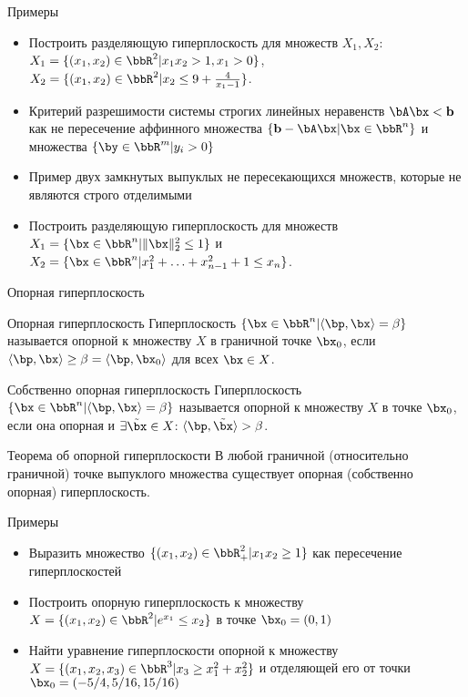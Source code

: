 \documentclass[12pt]{beamer}
\begin{document}
\begin{frame}{Примеры}
\begin{itemize}
\item Построить разделяющую гиперплоскость для множеств $X_1, X_2$: $X_1 = \{ (x_1, x_2) \in \bbR^2 | x_1x_2 > 1, x_1 > 0 \}$, $X_2 = \{ (x_1, x_2) \in \bbR^2 |  x_2 \leq 9 + \frac{4}{x_1 - 1} \}$.
\item Критерий разрешимости системы строгих линейных неравенств $\bA\bx < \mathbf{b}$ как не пересечение аффинного множества $\{\mathbf{b} - \bA\bx | \bx \in \bbR^n \}$ и множества $\{ \by \in \bbR^m | y_i > 0 \}$ 
\item Пример двух замкнутых выпуклых не пересекающихся множеств, которые не являются строго отделимыми
\item Построить разделяющую гиперплоскость для множеств $X_1 = \{ \bx \in \bbR^n | \| \bx \|^2_2 \leq 1 \}$ и $X_2 = \{ \bx \in \bbR^n | x_1^2 + \ldots + x_{n-1}^2 + 1 \leq x_n \}$.
\end{itemize}
\end{frame}

\begin{frame}{Опорная гиперплоскость}
\begin{block}{Опорная гиперплоскость}
Гиперплоскость $\{ \bx \in \bbR^n | \langle \bp, \bx \rangle = \beta \}$ называется опорной к множеству $X$ в граничной точке $\bx_0$, если $\langle \bp, \bx \rangle \geq \beta = \langle \bp, \bx_0 \rangle$ для всех $\bx \in X$.
\end{block}

\begin{block}{Собственно опорная гиперплоскость}
Гиперплоскость $\{ \bx \in \bbR^n | \langle \bp, \bx \rangle = \beta \}$ называется опорной к множеству $X$ в точке $\bx_0$, если она опорная и $\exists \tilde{\bx} \in X$: $\langle \bp, \tilde{\bx} \rangle > \beta$.
\end{block}

\begin{block}{Теорема об опорной гиперплоскости}
В любой граничной (относительно граничной) точке выпуклого множества существует опорная (собственно опорная) гиперплоскость.
\end{block}
\end{frame}


\begin{frame}{Примеры}
\begin{itemize}
\item Выразить множество $\{ (x_1, x_2) \in \bbR_+^2| x_1x_2 \geq 1\}$ как пересечение гиперплоскостей
\item Построить опорную гиперплоскость к множеству $X = \{ (x_1, x_2) \in \bbR^2 | e^{x_1} \leq x_2 \}$ в точке $\bx_0 = (0, 1)$
\item Найти уравнение гиперплоскости опорной к множеству $X = \{ (x_1, x_2, x_3) \in \bbR^3 | x_3 \geq x_1^2 + x_2^2 \}$ и отделяющей его от точки $\bx_0 = (-5/4, 5 / 16, 15/16)$
\end{itemize}
\end{frame}
\end{document}
